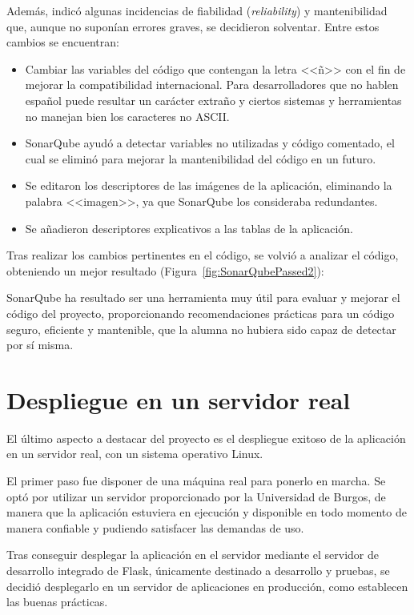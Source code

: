 Además, indicó algunas incidencias de fiabilidad (\textit{reliability}) y mantenibilidad que, aunque no suponían errores graves, se decidieron solventar. Entre estos cambios se encuentran:
\begin{itemize}
    \item Cambiar las variables del código que contengan la letra <<ñ>> con el fin de mejorar la compatibilidad internacional. Para desarrolladores que no hablen español puede resultar un carácter extraño y ciertos sistemas y herramientas no manejan bien los caracteres no ASCII.
    \item SonarQube ayudó a detectar variables no utilizadas y código comentado, el cual se eliminó para mejorar la mantenibilidad del código en un futuro.
    \item Se editaron los descriptores de las imágenes de la aplicación, eliminando la palabra <<imagen>>, ya que SonarQube los consideraba redundantes.
    \item Se añadieron descriptores explicativos a las tablas de la aplicación.
\end{itemize}

Tras realizar los cambios pertinentes en el código, se volvió a analizar el código, obteniendo un mejor resultado (Figura~\ref{fig:SonarQubePassed2}):

SonarQube ha resultado ser una herramienta muy útil para evaluar y mejorar el código del proyecto, proporcionando recomendaciones prácticas para un código seguro, eficiente y mantenible, que la alumna no hubiera sido capaz de detectar por sí misma.




\section{Despliegue en un servidor real}
El último aspecto a destacar del proyecto es el despliegue exitoso de la aplicación en un servidor real, con un sistema operativo Linux.

El primer paso fue disponer de una máquina real para ponerlo en marcha. Se optó por utilizar un servidor proporcionado por la Universidad de Burgos, de manera que la aplicación estuviera en ejecución y disponible en todo momento de manera confiable y pudiendo satisfacer las demandas de uso.

Tras conseguir desplegar la aplicación en el servidor mediante el servidor de desarrollo integrado de Flask, únicamente destinado a desarrollo y pruebas, se decidió desplegarlo en un servidor de aplicaciones en producción, como establecen las buenas prácticas.


